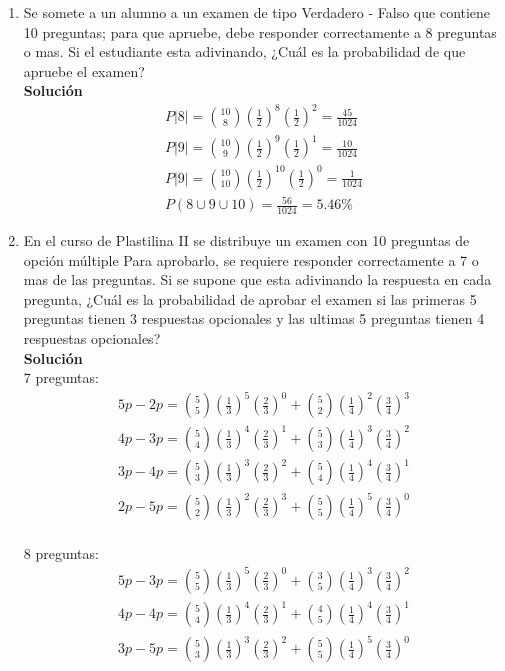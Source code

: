 \begin{enumerate}
    \item Se somete a un alumno a un examen de tipo Verdadero - Falso que contiene 10 preguntas; para que apruebe, debe responder correctamente a 8 preguntas o mas. Si el estudiante esta adivinando,  ¿Cuál es la probabilidad de que apruebe el examen?
    \\\textbf{Solución}
    \begin{gather*}
    P|8| = \binom{10}{8}(\frac{1}{2})^8(\frac{1}{2})^2 = \frac{45}{1024}\\
    P|9| = \binom{10}{9}(\frac{1}{2})^9(\frac{1}{2})^1 = \frac{10}{1024}\\
    P|9| = \binom{10}{10}(\frac{1}{2})^{10}(\frac{1}{2})^0 = \frac{1}{1024}\\
    P(8 \cup 9 \cup 10) = \frac{56}{1024} = 5.46\% 
    \end{gather*}
    \item En el curso de Plastilina II se distribuye un examen con 10 preguntas de opción múltiple Para aprobarlo, se requiere responder correctamente a 7 o mas de las preguntas. Si se supone que esta adivinando la respuesta en cada pregunta, ¿Cuál es la probabilidad de aprobar el examen si las primeras 5 preguntas tienen 3 respuestas opcionales y las ultimas 5 preguntas tienen 4 respuestas opcionales?
    \\\textbf{Solución}\\
    7 preguntas:
    \begin{gather*}
    5p-2p = \binom{5}{5}(\frac{1}{3})^{5}(\frac{2}{3})^0 + \binom{5}{2}(\frac{1}{4})^{2}(\frac{3}{4})^3\\
    4p-3p = \binom{5}{4}(\frac{1}{3})^{4}(\frac{2}{3})^1 + \binom{5}{3}(\frac{1}{4})^{3}(\frac{3}{4})^2\\
    3p-4p = \binom{5}{3}(\frac{1}{3})^{3}(\frac{2}{3})^2 + \binom{5}{4}(\frac{1}{4})^{4}(\frac{3}{4})^1\\
    2p-5p = \binom{5}{2}(\frac{1}{3})^{2}(\frac{2}{3})^3 + \binom{5}{5}(\frac{1}{4})^{5}(\frac{3}{4})^0\\
    \end{gather*}
    
    8 preguntas:
    \begin{gather*}
    5p-3p = \binom{5}{5}(\frac{1}{3})^{5}(\frac{2}{3})^0 + \binom{3}{5}(\frac{1}{4})^{3}(\frac{3}{4})^2\\
    4p-4p = \binom{5}{4}(\frac{1}{3})^{4}(\frac{2}{3})^1 + \binom{4}{5}(\frac{1}{4})^{4}(\frac{3}{4})^1\\
    3p-5p = \binom{5}{3}(\frac{1}{3})^{3}(\frac{2}{3})^2 + \binom{5}{5}(\frac{1}{4})^{5}(\frac{3}{4})^0\\
    \end{gather*}
    

\end{enumerate}

